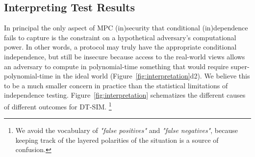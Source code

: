 \documentclass[acmlarge, manuscript, screen, review, anonymous, table]{acmart}
\newcommand{\toolname}{\textsc{DT-SIM}\xspace}
\begin{document}
\subsection{Interpreting Test Results}

In principal the only aspect of MPC (in)security that conditional (in)dependence fails to capture
is the constraint on a hypothetical adversary's computational power.
In other words, a protocol may truly have the appropriate conditional independence,
but still be insecure because access to the real-world views allows an adversary to compute in polynomial-time
something that would require super-polynomial-time in the ideal world
(Figure~\ref{fig:interpretation}d2).
We believe this to be a much smaller concern in practice than the statistical limitations of independence testing.
Figure~\ref{fig:interpretation} schematizes the different causes of different outcomes for \toolname.
\footnote{We avoid the vocabulary of \emph{"false positives"} and \emph{"false negatives"},
because keeping track of the layered polarities of the situation is a source of confusion.}
\end{document}
